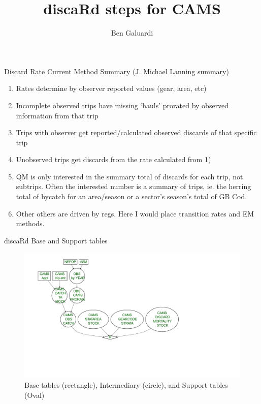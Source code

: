 \documentclass[
  ignorenonframetext,
]{beamer}
\title{discaRd steps for CAMS}
\author{Ben Galuardi}
\date{}
\providecommand{\tightlist}{%
  \setlength{\itemsep}{0pt}\setlength{\parskip}{0pt}}
\begin{document}
\frame{\titlepage}

\begin{frame}{Discard Rate Current Method Summary (J. Michael Lanning
summary)}
\protect\hypertarget{discard-rate-current-method-summary-j.-michael-lanning-summary}{}

\begin{enumerate}
\tightlist
\item
  Rates determine by observer reported values (gear, area, etc)
\item
  Incomplete observed trips have missing `hauls' prorated by observed
  information from that trip
\item
  Trips with observer get reported/calculated observed discards of that
  specific trip
\item
  Unobserved trips get discards from the rate calculated from 1)
\item
  QM is only interested in the summary total of discards for each trip,
  not subtrips. Often the interested number is a summary of trips, ie.
  the herring total of bycatch for an area/season or a sector's season's
  total of GB Cod.
\item
  Other others are driven by regs. Here I would place transition rates
  and EM methods.
\end{enumerate}

\end{frame}

\begin{frame}{discaRd Base and Support tables}
\protect\hypertarget{discard-base-and-support-tables}{}

\begin{figure}
\centering
\includegraphics{discard_documention_beamer_files/figure-beamer/table_flow0-1.pdf}
\caption{Base tables (rectangle), Intermediary (circle), and Support
tables (Oval)}
\end{figure}

\end{frame}
\end{document}
